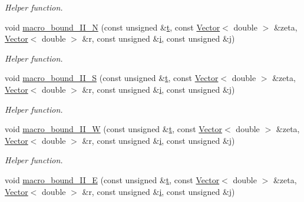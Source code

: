 \begin{DoxyCompactItemize}
\begin{DoxyCompactList}\small\item\em Helper function. \end{DoxyCompactList}\item 
void \hyperlink{classoomph_1_1ChannelWithLeafletDomain_a1402c0d3fe42a8ffd6c9fb1d6df9d460}{macro\+\_\+bound\+\_\+\+I\+I\+\_\+N} (const unsigned \&\hyperlink{cfortran_8h_af6f0bd3dc13317f895c91323c25c2b8f}{t}, const \hyperlink{classoomph_1_1Vector}{Vector}$<$ double $>$ \&zeta, \hyperlink{classoomph_1_1Vector}{Vector}$<$ double $>$ \&r, const unsigned \&\hyperlink{cfortran_8h_adb50e893b86b3e55e751a42eab3cba82}{i}, const unsigned \&j)
\begin{DoxyCompactList}\small\item\em Helper function. \end{DoxyCompactList}\item 
void \hyperlink{classoomph_1_1ChannelWithLeafletDomain_a565166bede89908189cc8e426a898859}{macro\+\_\+bound\+\_\+\+I\+I\+\_\+S} (const unsigned \&\hyperlink{cfortran_8h_af6f0bd3dc13317f895c91323c25c2b8f}{t}, const \hyperlink{classoomph_1_1Vector}{Vector}$<$ double $>$ \&zeta, \hyperlink{classoomph_1_1Vector}{Vector}$<$ double $>$ \&r, const unsigned \&\hyperlink{cfortran_8h_adb50e893b86b3e55e751a42eab3cba82}{i}, const unsigned \&j)
\begin{DoxyCompactList}\small\item\em Helper function. \end{DoxyCompactList}\item 
void \hyperlink{classoomph_1_1ChannelWithLeafletDomain_afa35af75e7a60d3e5d4adf6a8097825e}{macro\+\_\+bound\+\_\+\+I\+I\+\_\+W} (const unsigned \&\hyperlink{cfortran_8h_af6f0bd3dc13317f895c91323c25c2b8f}{t}, const \hyperlink{classoomph_1_1Vector}{Vector}$<$ double $>$ \&zeta, \hyperlink{classoomph_1_1Vector}{Vector}$<$ double $>$ \&r, const unsigned \&\hyperlink{cfortran_8h_adb50e893b86b3e55e751a42eab3cba82}{i}, const unsigned \&j)
\begin{DoxyCompactList}\small\item\em Helper function. \end{DoxyCompactList}\item 
void \hyperlink{classoomph_1_1ChannelWithLeafletDomain_a9083a5ac562feb1cd33d78e6cc18b257}{macro\+\_\+bound\+\_\+\+I\+I\+\_\+E} (const unsigned \&\hyperlink{cfortran_8h_af6f0bd3dc13317f895c91323c25c2b8f}{t}, const \hyperlink{classoomph_1_1Vector}{Vector}$<$ double $>$ \&zeta, \hyperlink{classoomph_1_1Vector}{Vector}$<$ double $>$ \&r, const unsigned \&\hyperlink{cfortran_8h_adb50e893b86b3e55e751a42eab3cba82}{i}, const unsigned \&j)

\end{DoxyCompactItemize}
